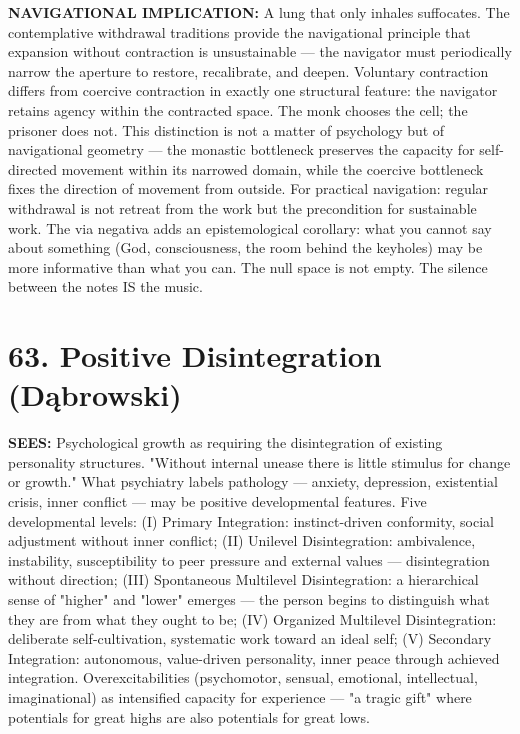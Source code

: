 \textbf{NAVIGATIONAL IMPLICATION:} A lung that only inhales suffocates. The contemplative withdrawal traditions provide the navigational principle that expansion without contraction is unsustainable — the navigator must periodically narrow the aperture to restore, recalibrate, and deepen. Voluntary contraction differs from coercive contraction in exactly one structural feature: the navigator retains agency within the contracted space. The monk chooses the cell; the prisoner does not. This distinction is not a matter of psychology but of navigational geometry — the monastic bottleneck preserves the capacity for self-directed movement within its narrowed domain, while the coercive bottleneck fixes the direction of movement from outside. For practical navigation: regular withdrawal is not retreat from the work but the precondition for sustainable work. The via negativa adds an epistemological corollary: what you cannot say about something (God, consciousness, the room behind the keyholes) may be more informative than what you can. The null space is not empty. The silence between the notes IS the music.


\bigskip\noindent\makebox[\textwidth]{\color{rulegray}\rule{5cm}{0.3pt}}\bigskip


\section*{63. Positive Disintegration (Dąbrowski)}


\textbf{SEES:} Psychological growth as requiring the disintegration of existing personality structures. "Without internal unease there is little stimulus for change or growth." What psychiatry labels pathology — anxiety, depression, existential crisis, inner conflict — may be positive developmental features. Five developmental levels: (I) Primary Integration: instinct-driven conformity, social adjustment without inner conflict; (II) Unilevel Disintegration: ambivalence, instability, susceptibility to peer pressure and external values — disintegration without direction; (III) Spontaneous Multilevel Disintegration: a hierarchical sense of "higher" and "lower" emerges — the person begins to distinguish what they are from what they ought to be; (IV) Organized Multilevel Disintegration: deliberate self-cultivation, systematic work toward an ideal self; (V) Secondary Integration: autonomous, value-driven personality, inner peace through achieved integration. Overexcitabilities (psychomotor, sensual, emotional, intellectual, imaginational) as intensified capacity for experience — "a tragic gift" where potentials for great highs are also potentials for great lows.


